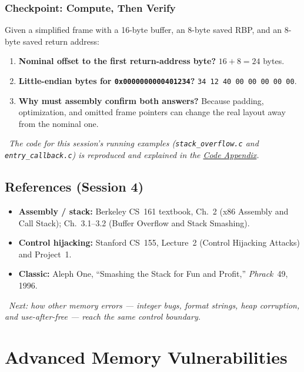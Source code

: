\documentclass[hidelinks]{article}
\newcommand{\callout}[1]{\par\smallskip\noindent{\color{capri}$\blacktriangleright$}\ \textit{#1}\par\smallskip}
\begin{document}
\subsubsection{Checkpoint: Compute, Then Verify}

Given a simplified frame with a 16-byte buffer, an 8-byte saved RBP, and an 8-byte saved return address:
\begin{enumerate}
    \item \textbf{Nominal offset to the first return-address byte?} $16 + 8 = 24$ bytes.
    \item \textbf{Little-endian bytes for \texttt{0x0000000000401234}?} \texttt{34 12 40 00 00 00 00 00}.
    \item \textbf{Why must assembly confirm both answers?} Because padding, optimization, and omitted frame pointers can change the real layout away from the nominal one.
\end{enumerate}

\callout{The code for this session's running examples (\texttt{stack\_overflow.c} and \texttt{entry\_callback.c}) is reproduced and explained in the \hyperref[sec:code]{Code Appendix}.}

\subsection{References (Session 4)}

\begin{itemize}
    \item \textbf{Assembly / stack:} Berkeley CS~161 textbook, Ch.~2 (x86 Assembly and Call Stack); Ch.~3.1--3.2 (Buffer Overflow and Stack Smashing).
    \item \textbf{Control hijacking:} Stanford CS~155, Lecture~2 (Control Hijacking Attacks) and Project~1.
    \item \textbf{Classic:} Aleph One, ``Smashing the Stack for Fun and Profit,'' \textit{Phrack}~49, 1996.
\end{itemize}

\callout{Next: how other memory errors --- integer bugs, format strings, heap corruption, and use-after-free --- reach the \emph{same} control boundary.}

\newpage
\section{Advanced Memory Vulnerabilities}
\end{document}
